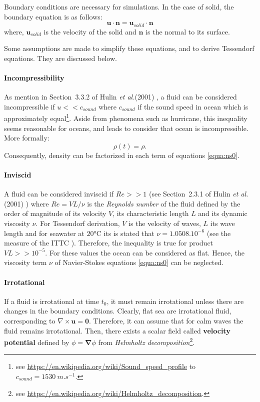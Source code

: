\documentclass[final]{jcgt}
\def\etal{\emph{et al.}\xspace}
\begin{document}
Boundary conditions are necessary for simulations. In the case of solid, the boundary equation is as follows:
\begin{equation}
	\mathbf{u}\cdot\mathbf{n} = \mathbf{u}_{solid} \cdot \mathbf{n}
\end{equation}
where, $\mathbf{u}_{solid}$ is the velocity of the solid and $\mathbf{n}$ is the normal to its surface.

Some assumptions are made to simplify these equations, and to derive Tessendorf equations.
They are discussed below.

\paragraph{Incompressibility}
As mention in Section~3.3.2 of Hulin \etal (2001) \cite{hulinHydrodynamiquePhysique2001}, a fluid can be considered incompressible if $u<<c_{sound}$ where $c_{sound}$ if the sound speed in ocean which is approximately equal\footnote{see \url{https://en.wikipedia.org/wiki/Sound_speed_profile} to $c_{sound} = 1530~m.s^{-1}$.}.
Aside from phenomena such as hurricane, this inequality seems reasonable for oceans, and leads to consider that ocean is incompressible.
More formally:
\begin{equation}
	\rho(t)=\rho.
\end{equation}
Consequently, density can be factorized in each term of equations \ref{equa:ns0}.

\paragraph{Inviscid}
A fluid can be considered inviscid if $Re>>1$ (see Section~2.3.1 of Hulin \etal (2001) \cite{hulinHydrodynamiquePhysique2001}) where $Re=VL/\nu$ is the \emph{Reynolds number} of the fluid defined by the order of magnitude of its velocity $V$, its characteristic length $L$ and its dynamic viscosity $\nu$.
For Tessendorf derivation, $V$ is the velocity of waves, $L$ its wave length and for seawater at $20$°C its is stated that $\nu=1.0508.10^{-6}$ (see the measure of the ITTC \cite{ittcFreshWaterSeawater2011}).
Therefore, the inequality is true for product $VL >> 10^{-5}$.
For these values the ocean can be considered as flat.
Hence, the viscosity term $\nu$ of Navier-Stokes equations \ref{equa:ns0} can be neglected.

\paragraph{Irrotational}
If a fluid is irrotational at time $t_0$, it must remain irrotational unless there are changes in the boundary conditions.
Clearly, flat sea are irrotational fluid, corresponding to $\nabla\times\mathbf{u} = \mathbf{0}$.
Therefore, it can assume that for calm waves the fluid remains irrotational.
Then, there exists a scalar field called \textbf{velocity potential} defined by $\phi = \mathbf{\nabla} \phi$ from \emph{Helmholtz decomposition}\footnote{see \url{https://en.wikipedia.org/wiki/Helmholtz_decomposition}.}.
\end{document}
